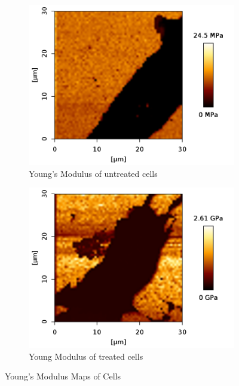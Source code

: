 \documentclass[a4paper,english,12pt,bibliography=totoc]{scrreprt}
\begin{document}
\begin{figure}[H]
    \begin{subfigure}{0.45\textwidth}
        \centering
        \includegraphics[width=\textwidth]{untreated/modulus.png}
        \caption{Young's Modulus of untreated cells}
        \label{fig:ym_untreated}
    \end{subfigure}
    \begin{subfigure}{0.45\textwidth}
        \centering
        \includegraphics[width=\textwidth]{treated/modulus.png}
        \caption{Young Modulus of treated cells}
        \label{fig:ym_treated}
    \end{subfigure}
    \caption{Young's Modulus Maps of Cells}
    \label{fig:main}
\end{figure}
\end{document}
